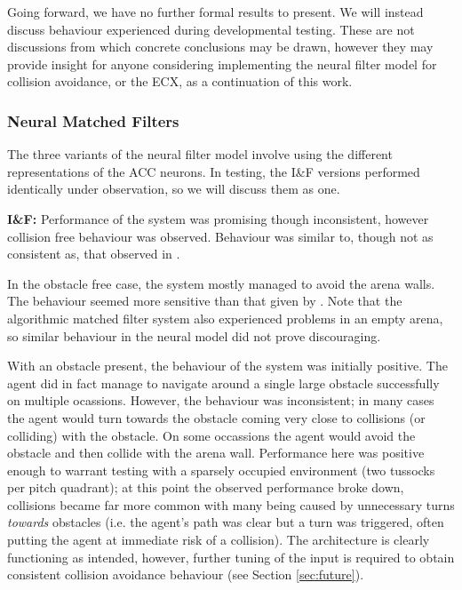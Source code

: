 \documentclass[a4paper,11pt,twoside,openright]{article}
\begin{document}
Going forward, we have no further formal results to present. We will
instead discuss behaviour experienced during developmental
testing. These are not discussions from which concrete conclusions may
be drawn, however they may provide insight for anyone considering
implementing the neural filter model for collision avoidance, or the
ECX, as a continuation of this work.

\subsubsection{Neural Matched Filters}
The three variants of the neural filter model involve using the
different representations of the ACC neurons. In testing, the I\&F
versions performed identically under observation, so we will discuss
them as one.\newline\par

\textbf{I\&F:} Performance of the system was promising though
inconsistent, however collision free behaviour was observed. Behaviour
was similar to, though not as consistent as, that observed in
\cite{Mitchell2018}.
\newline\par

In the obstacle free case, the system mostly managed to avoid the
arena walls. The behaviour seemed more sensitive than
that given by \cite{Mitchell2018}. Note that the algorithmic matched
filter system also experienced problems in an empty arena, so similar
behaviour in the neural model did not prove discouraging.
\newline\par

With an obstacle present, the behaviour of the system was initially
positive. The agent did in fact manage to navigate around a single
large obstacle successfully on multiple ocassions. However, the
behaviour was inconsistent; in many cases the agent would turn
towards the obstacle coming very close to collisions (or colliding)
with the obstacle. On some occassions the agent would avoid the
obstacle and then collide with the arena wall. Performance here was
positive enough to warrant testing with a sparsely occupied
environment (two tussocks per pitch quadrant); at this point the
observed performance broke down, collisions became far more common
with many being caused by unnecessary turns \textit{towards} obstacles
(i.e. the agent's path was clear but a turn was triggered, often
putting the agent at immediate risk of a collision). The architecture
is clearly functioning as intended, however, further tuning of the
input is required to obtain consistent collision avoidance behaviour
(see Section \ref{sec:future}).
\newline\par
\end{document}
